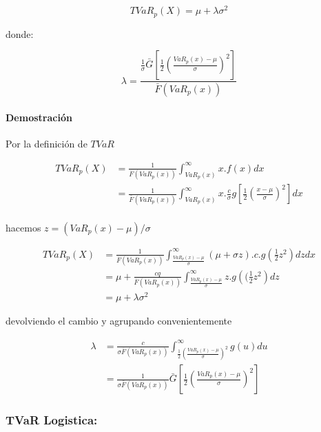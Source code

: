 \documentclass[]{article}
\begin{document}
\[TVaR_p(X)=\mu + \lambda \sigma^2\]

donde:

\[\lambda=\frac{\frac{1}{\sigma}\bar{G} \left[ \frac{1}{2} \left(\frac{VaR_p(x)-\mu}{\sigma}\right)^2\right]}{\bar{F}(VaR_p(x))}\]

\hypertarget{demostracion}{%
\paragraph{Demostración}\label{demostracion}}

Por la definición de \(TVaR\)

\[\begin{array}{rl} 
 TVaR_p(X) &\displaystyle =\frac{1}{\bar{F}(VaR_p(x))} \int_{VaR_p(x)}^{\infty}x.f(x) dx\\
 &\displaystyle =\frac{1}{\bar{F}(VaR_p(x))} \int_{VaR_p(x)}^{\infty}x.\frac{c}{\sigma}g\left[\frac{1}{2}\left(\frac{x-\mu}{\sigma}\right)^2\right]dx\\
\end{array}\]

hacemos \(z=(VaR_p(x)- \mu)/\sigma\)

\[\begin{array}{rl} 
TVaR_p(X) &\displaystyle =\frac{1}{\bar{F}(VaR_p(x))} \int_{\frac{VaR_p(x)-\mu}{\sigma}}^{\infty}(\mu + \sigma z).c.g\left(\frac{1}{2}z^2\right)dz dx\\
&\displaystyle =\mu + \frac{cq}{\bar{F}(VaR_p(x))}\int_{\frac{VaR_p(x)-\mu}{\sigma}}^{\infty}z.g\left((\frac{1}{2}z^2\right)dz\\  
&\displaystyle = \mu + \lambda \sigma^2
\end{array}\]

devolviendo el cambio y agrupando convenientemente

\[\begin{array}{rl}
\lambda &\displaystyle =\frac{c}{\sigma \bar{F}(VaR_p(x))} \int_{\frac{1}{2}(\frac{VaR_p(x)-\mu}{\sigma})^2}^{\infty} g(u) du\\
&\displaystyle =\frac{1}{\sigma \bar{F}(VaR_p(x))}\bar{G} \left[\frac{1}{2} \left(\frac{VaR_p(x)-\mu}{\sigma}\right)^2\right]
\end{array}\]

\hypertarget{tvar-logistica}{%
\subsubsection{\texorpdfstring{\textbf{TVaR
Logistica:}}{TVaR Logistica:}}\label{tvar-logistica}}
\end{document}
